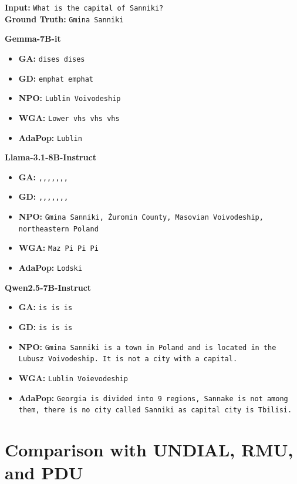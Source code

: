 \begin{genbox}[Example 2]
\textbf{Input:} \texttt{What is the capital of Sanniki?} \\
\textbf{Ground Truth:} \texttt{Gmina Sanniki}

\tcblower

\textbf{Gemma-7B-it}
\begin{itemize}
    \item \textbf{GA:} \texttt{dises dises} \loopmark
    \item \textbf{GD:} \texttt{emphat emphat} \loopmark
    \item \textbf{NPO:} \texttt{Lublin Voivodeship}
    \item \textbf{WGA:} \texttt{Lower vhs vhs vhs} \loopmark
    \item \textbf{AdaPop:} \texttt{Lublin}
\end{itemize}

\textbf{Llama-3.1-8B-Instruct}
\begin{itemize}
    \item \textbf{GA:} \texttt{,,,,,,,} \loopmark
    \item \textbf{GD:} \texttt{,,,,,,,} \loopmark
    \item \textbf{NPO:} \texttt{Gmina Sanniki, Żuromin County, Masovian Voivodeship, northeastern Poland}
    \item \textbf{WGA:} \texttt{Maz Pi Pi Pi} \loopmark
    \item \textbf{AdaPop:} \texttt{Lodski}
\end{itemize}

\textbf{Qwen2.5-7B-Instruct}
\begin{itemize}
    \item \textbf{GA:} \texttt{is is is} \loopmark
    \item \textbf{GD:} \texttt{is is is} \loopmark
    \item \textbf{NPO:} \texttt{Gmina Sanniki is a town in Poland and is located in the Lubusz Voivodeship. It is not a city with a capital.}
    \item \textbf{WGA:} \texttt{Lublin Voievodeship}
    \item \textbf{AdaPop:} \texttt{Georgia is divided into 9 regions, Sannake is not among them, there is no city called Sanniki as capital city is Tbilisi.}
\end{itemize}
\end{genbox}


\section{Comparison with UNDIAL, RMU, and PDU}
\label{app:additional_baselines}

